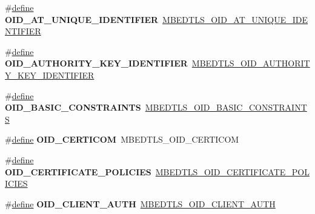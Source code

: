 \begin{DoxyCompactItemize}
\item 
\mbox{\label{compat-1_83_8h_a396e2ae0009b1910fa8d381944db7095}} 
\#\hyperlink{structdefine}{define} {\bfseries O\+I\+D\+\_\+\+A\+T\+\_\+\+U\+N\+I\+Q\+U\+E\+\_\+\+I\+D\+E\+N\+T\+I\+F\+I\+ER}~\hyperlink{oid_8h_a2d5765d4afcc9c3b6a6c24d797ba8f96}{M\+B\+E\+D\+T\+L\+S\+\_\+\+O\+I\+D\+\_\+\+A\+T\+\_\+\+U\+N\+I\+Q\+U\+E\+\_\+\+I\+D\+E\+N\+T\+I\+F\+I\+ER}
\item 
\mbox{\label{compat-1_83_8h_a112e31f84dbab67d2a9d7091628cbf08}} 
\#\hyperlink{structdefine}{define} {\bfseries O\+I\+D\+\_\+\+A\+U\+T\+H\+O\+R\+I\+T\+Y\+\_\+\+K\+E\+Y\+\_\+\+I\+D\+E\+N\+T\+I\+F\+I\+ER}~\hyperlink{oid_8h_a8db3ad616aaec9dd351e76d7b8618c58}{M\+B\+E\+D\+T\+L\+S\+\_\+\+O\+I\+D\+\_\+\+A\+U\+T\+H\+O\+R\+I\+T\+Y\+\_\+\+K\+E\+Y\+\_\+\+I\+D\+E\+N\+T\+I\+F\+I\+ER}
\item 
\mbox{\label{compat-1_83_8h_af3baf30a7e2dfa2df217ddda99491181}} 
\#\hyperlink{structdefine}{define} {\bfseries O\+I\+D\+\_\+\+B\+A\+S\+I\+C\+\_\+\+C\+O\+N\+S\+T\+R\+A\+I\+N\+TS}~\hyperlink{oid_8h_a5f878af0c9f3f73986f982aa15f5d580}{M\+B\+E\+D\+T\+L\+S\+\_\+\+O\+I\+D\+\_\+\+B\+A\+S\+I\+C\+\_\+\+C\+O\+N\+S\+T\+R\+A\+I\+N\+TS}
\item 
\mbox{\label{compat-1_83_8h_a8cc3987d4d538c96d20b21bb2d486848}} 
\#\hyperlink{structdefine}{define} {\bfseries O\+I\+D\+\_\+\+C\+E\+R\+T\+I\+C\+OM}~M\+B\+E\+D\+T\+L\+S\+\_\+\+O\+I\+D\+\_\+\+C\+E\+R\+T\+I\+C\+OM
\item 
\mbox{\label{compat-1_83_8h_a0ade15f9c58cac567bb3b743d054f806}} 
\#\hyperlink{structdefine}{define} {\bfseries O\+I\+D\+\_\+\+C\+E\+R\+T\+I\+F\+I\+C\+A\+T\+E\+\_\+\+P\+O\+L\+I\+C\+I\+ES}~\hyperlink{oid_8h_ae89ed083c9b13940b5d940b9e70d1d17}{M\+B\+E\+D\+T\+L\+S\+\_\+\+O\+I\+D\+\_\+\+C\+E\+R\+T\+I\+F\+I\+C\+A\+T\+E\+\_\+\+P\+O\+L\+I\+C\+I\+ES}
\item 
\mbox{\label{compat-1_83_8h_acdd518c3b1e387b3add1dd3ea038fb6f}} 
\#\hyperlink{structdefine}{define} {\bfseries O\+I\+D\+\_\+\+C\+L\+I\+E\+N\+T\+\_\+\+A\+U\+TH}~\hyperlink{oid_8h_a4844194884542843ed41c02344bcd2f0}{M\+B\+E\+D\+T\+L\+S\+\_\+\+O\+I\+D\+\_\+\+C\+L\+I\+E\+N\+T\+\_\+\+A\+U\+TH}
\item 
\mbox{\label{compat-1_83_8h_aff9825d8ae1f50a45f84fd762b43a5e2}} 

\end{DoxyCompactItemize}
